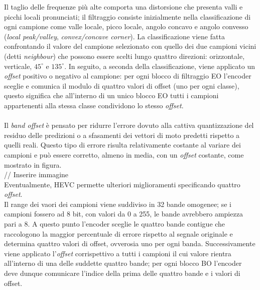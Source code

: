 Il taglio delle frequenze più alte comporta una distorsione che presenta valli e
picchi locali pronunciati; il filtraggio consiste inizialmente nella 
classificazione di ogni campione come valle locale, picco locale, angolo concavo
e angolo convesso (\emph{local peak/valley}, \emph{convex/concave corner}).
La classificazione viene fatta confrontando il valore del campione selezionato 
con quello dei due campioni vicini (detti \emph{neighbour}) che possono essere 
scelti lungo quattro direzioni: orizzontale, verticale, $45^{\circ}$ e 
$135^{\circ}$. In seguito, a seconda della classificazione, viene applicato un
\emph{offset} positivo o negativo al campione: per ogni blocco di filtraggio EO
l'encoder sceglie e comunica il modulo di quattro valori di offset (uno per ogni
classe), questo significa che all'interno di un unico blocco EO tutti i campioni
appartenenti alla stessa classe condividono lo stesso \emph{offset}.
\\ \\
Il \emph{band offset} è pensato per ridurre l'errore dovuto alla cattiva 
quantizzazione del residuo delle predizioni o a sfasamenti dei vettori di moto 
predetti rispetto a quelli reali. Questo tipo di errore risulta relativamente 
costante al variare dei campioni e può essere corretto, almeno in media, con un 
\emph{offset} costante, come mostrato in figura.
\\
// Inserire immagine
\\
Eventualmente, HEVC permette ulteriori miglioramenti specificando quattro 
\emph{offset}. \\
Il range dei vaori dei campioni viene suddiviso in 32 bande omogenee; se i 
campioni fossero ad 8 bit, con valori da 0 a 255, le bande avrebbero ampiezza 
pari a 8. A questo punto l'encoder sceglie le quattro bande contigue che 
raccologono la maggior percentuale di errore rispetto al segnale originale e 
determina quattro valori di offset, ovverosia uno per ogni banda. 
Successivamente viene applicato l'\emph{offset} corrispettivo a tutti i campioni
il cui valore rientra all'interno di una delle suddette quattro bande; per ogni 
blocco BO l'encoder deve dunque comunicare l'indice della prima delle quattro 
bande e i valori di offset.



